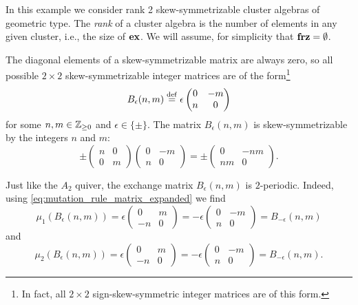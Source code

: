 \begin{example}

	In this example we consider rank 2 skew-symmetrizable cluster algebras of geometric
	type. The \emph{rank} of a cluster algebra is the number of
	elements in any given cluster, i.e., the size of $\mathbf{ex}$. We will assume, for simplicity
	that $\mathbf{frz} = \emptyset$.

	The diagonal elements of a skew-symmetrizable matrix are always zero, so all possible
	$2\times2$ skew-symmetrizable integer matrices are of the form\footnote{In fact, all
		$2\times 2$ sign-skew-symmetric integer matrices are of this form.}
	\begin{equation*}
		B_\epsilon(n,m) \overset{\mathrm{def}}{=} \epsilon\begin{pmatrix}
			0 & -m \\
			n & 0
		\end{pmatrix}
	\end{equation*}
	for some $n,m \in \mathbb{Z}_{\geq 0}$ and $\epsilon \in \{\pm\}$. The matrix $B_\epsilon(n,
		m)$ is skew-symmetrizable by the integers $n$ and $m$:
	\begin{equation*}
		\pm
		\begin{pmatrix}
			n & 0 \\
			0 & m
		\end{pmatrix}
		\begin{pmatrix}
			0 & -m \\
			n & 0
		\end{pmatrix}
		= \pm \begin{pmatrix}
			0  & -nm \\
			nm & 0
		\end{pmatrix}.
	\end{equation*}

	Just like the $A_2$ quiver, the exchange matrix $B_\epsilon(n,m)$ is $2$-periodic.
	Indeed, using \cref{eq:mutation_rule_matrix_expanded} we find
	\begin{equation*}
		\mu_1(B_\epsilon(n,m)) = \epsilon\begin{pmatrix}
			0  & m \\
			-n & 0
		\end{pmatrix}
		= -\epsilon \begin{pmatrix}
			0 & -m \\
			n & 0
		\end{pmatrix}
		= B_{-\epsilon}(n, m)
	\end{equation*}
	and
	\begin{equation*}
		\mu_2(B_\epsilon(n,m)) = \epsilon\begin{pmatrix}
			0  & m \\
			-n & 0
		\end{pmatrix}
		= -\epsilon \begin{pmatrix}
			0 & -m \\
			n & 0
		\end{pmatrix}
		=  B_{-\epsilon}(n,m).
	\end{equation*}


\end{example}
